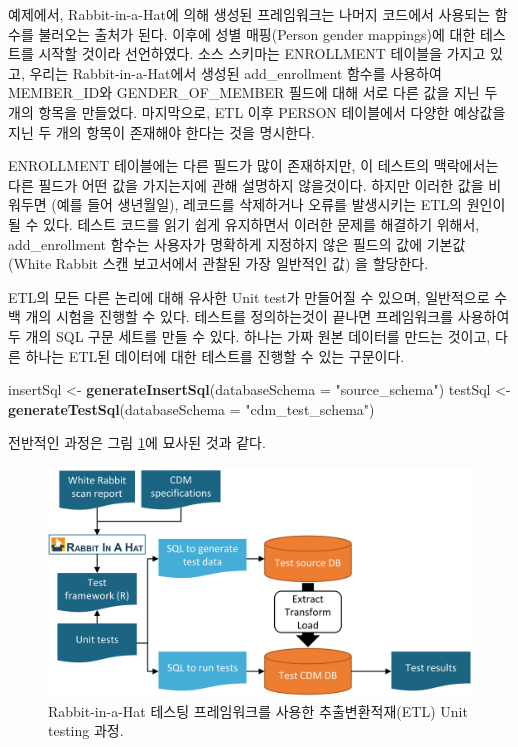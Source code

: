 \documentclass[10.5pt]{book}
\newenvironment{Shaded}{\begin{snugshade}}{\end{snugshade}}
\newcommand{\KeywordTok}[1]{\textcolor[rgb]{0.13,0.29,0.53}{\textbf{#1}}}
\newcommand{\DataTypeTok}[1]{\textcolor[rgb]{0.13,0.29,0.53}{#1}}
\newcommand{\StringTok}[1]{\textcolor[rgb]{0.31,0.60,0.02}{#1}}
\newcommand{\NormalTok}[1]{#1}
\theoremstyle{definition}
\theoremstyle{definition}
\theoremstyle{definition}
\theoremstyle{remark}
\begin{document}
예제에서, Rabbit-in-a-Hat에 의해 생성된 프레임워크는 나머지 코드에서
사용되는 함수를 불러오는 출처가 된다. 이후에 성별 매핑(Person gender
mappings)에 대한 테스트를 시작할 것이라 선언하였다. 소스 스키마는
ENROLLMENT 테이블을 가지고 있고, 우리는 Rabbit-in-a-Hat에서 생성된
add\_enrollment 함수를 사용하여 MEMBER\_ID와 GENDER\_OF\_MEMBER 필드에
대해 서로 다른 값을 지닌 두 개의 항목을 만들었다. 마지막으로, ETL 이후
PERSON 테이블에서 다양한 예상값을 지닌 두 개의 항목이 존재해야 한다는
것을 명시한다.

ENROLLMENT 테이블에는 다른 필드가 많이 존재하지만, 이 테스트의
맥락에서는 다른 필드가 어떤 값을 가지는지에 관해 설명하지 않을것이다.
하지만 이러한 값을 비워두면 (예를 들어 생년월일), 레코드를 삭제하거나
오류를 발생시키는 ETL의 원인이 될 수 있다. 테스트 코드를 읽기 쉽게
유지하면서 이러한 문제를 해결하기 위해서, add\_enrollment 함수는
사용자가 명확하게 지정하지 않은 필드의 값에 기본값 (White Rabbit 스캔
보고서에서 관찰된 가장 일반적인 값) 을 할당한다.

ETL의 모든 다른 논리에 대해 유사한 Unit test가 만들어질 수 있으며,
일반적으로 수백 개의 시험을 진행할 수 있다. 테스트를 정의하는것이 끝나면
프레임워크를 사용하여 두 개의 SQL 구문 세트를 만들 수 있다. 하나는 가짜
원본 데이터를 만드는 것이고, 다른 하나는 ETL된 데이터에 대한 테스트를
진행할 수 있는 구문이다.

\begin{Shaded}
\begin{Highlighting}[]
\NormalTok{insertSql <-}\StringTok{ }\KeywordTok{generateInsertSql}\NormalTok{(}\DataTypeTok{databaseSchema =} \StringTok{"source_schema"}\NormalTok{)}
\NormalTok{testSql <-}\StringTok{ }\KeywordTok{generateTestSql}\NormalTok{(}\DataTypeTok{databaseSchema =} \StringTok{"cdm_test_schema"}\NormalTok{)}
\end{Highlighting}
\end{Shaded}

전반적인 과정은 그림 \ref{fig:testFramework}에 묘사된 것과 같다.

\begin{figure}

{\centering \includegraphics[width=0.9\linewidth]{images/DataQuality/testFramework} 

}

\caption{Rabbit-in-a-Hat 테스팅 프레임워크를 사용한 추출변환적재(ETL) Unit testing 과정.}\label{fig:testFramework}
\end{figure}
\end{document}
